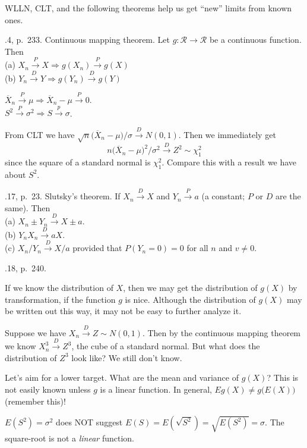 \documentclass[12pt]{article}
\begin{document}
WLLN, CLT, and the following theorems help us get
``new'' limits from known ones.

.4, p.~233. Continuous mapping theorem.
Let $g: \mathcal{R} \to \mathcal{R}$ be a continuous function.
Then\\[3pt]
(a) $X_n \xrightarrow{\;P\;} X
    \Rightarrow g(X_n) \xrightarrow{\;P\;} g(X)$\\[3pt]
(b) $Y_n \xrightarrow{\;D\;} Y
    \Rightarrow g(Y_n) \xrightarrow{\;D\;} g(Y)$

\example
$\overline{X}_n \xrightarrow{\;P\;} \mu \Rightarrow
    \overline{X}_n - \mu \xrightarrow{\;P\;} 0$.\\
$S^2 \xrightarrow{\;P\;} \sigma^2 \Rightarrow
    S  \xrightarrow{\;p\;} \sigma$.

\example
From CLT we have
$\sqrt{n}\bigl(\overline{X}_n - \mu\bigr) / \sigma
\xrightarrow{\;D\;} N(0,1)$.
Then we immediately get
\[
n\bigl(\overline{X}_n - \mu\bigr)^2 / \sigma^2
\xrightarrow{\;D\;} Z^2 \sim \chi^2_1
\]
since the square of a standard normal is $\chi^2_1$.
Compare this with a result we have about $S^2$.

.17, p.~23. Slutsky's theorem.
If $X_n \xrightarrow{\;D\;} X$ and $Y_n \xrightarrow{\;P\;} a$
(a constant; $P$ or $D$ are the same). Then\\[3pt]
(a) $X_n \pm Y_n \xrightarrow{\;D\;} X \pm a$.\\[3pt]
(b) $Y_nX_n \xrightarrow{\;D\;} aX$.\\[3pt]
(c) $X_n / Y_n \xrightarrow{\;D\;} X/a$ provided that
    $P(Y_n = 0) = 0$ for all $n$ and $v \ne 0$.

.18, p.~240.

If we know the distribution of $X$,
then we may get the distribution of $g(X)$ by transformation,
if the function $g$ is nice.
Although the distribution of $g(X)$ may be written out this way,
it may not be easy to further analyze it.

\example
Suppose we have
$X_n \xrightarrow{\;D\;} Z \sim N(0,1)$.
Then by the continuous mapping theorem we know
$X_n^3 \xrightarrow{\;D\;} Z^3$,
the cube of a standard normal.
But what does the distribution of $Z^3$
look like? We still don't know.

Let's aim for a lower target. What are the mean and variance of $g(X)$?
This is not easily known unless $g$ is a linear function.
In general, $Eg(X) \ne g\bigl(E(X)\bigr)$ (remember this)!

\example
$E(S^2) = \sigma^2$ does NOT suggest
$E(S) = E(\sqrt{S^2}) = \sqrt{E(S^2)} = \sigma$.
The square-root is not a \emph{linear} function.
\end{document}
